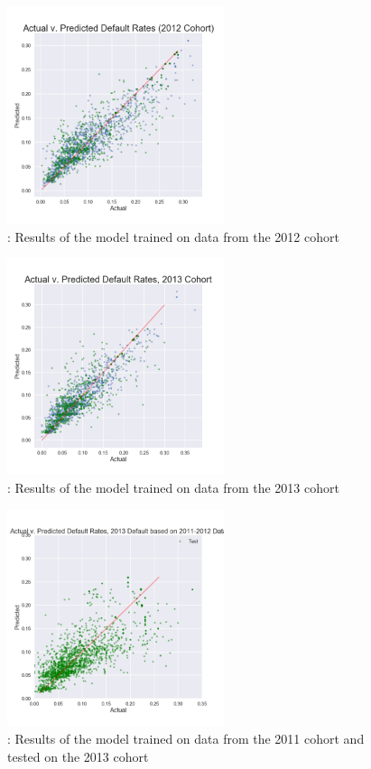 \documentclass[10pt,twocolumn]{article}
\begin{document}
\begin{figure}[!t]
  \begin{center}
    \includegraphics[width=2.5in]{results2012.png}
  \end{center}

  \caption{: Results of the model trained on data from the 2012 cohort}
  \label{results2012}
\end{figure}

\begin{figure}[!t]
  \begin{center}
    \includegraphics[width=2.5in]{results2013.png}
  \end{center}

  \caption{: Results of the model trained on data from the 2013 cohort}
  \label{results2013}
\end{figure}

\begin{figure}[!t]
  \begin{center}
    \includegraphics[width=2.5in]{2013from2011.png}
  \end{center}

  \caption{: Results of the model trained on data from the 2011 cohort
  and tested on the 2013 cohort}
  \label{results2013}
\end{figure}
\end{document}
